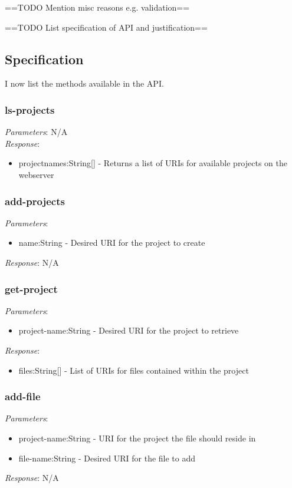 \documentclass{report}
\begin{document}
==TODO Mention misc reasons e.g. validation==


==TODO List specification of API and justification==
\subsection{Specification}
I now list the methods available in the API.
\subsubsection{ls-projects}

\emph{Parameters}: N/A
\\
\emph{Response}: 
\begin{itemize}
\item projectnames:String[] - Returns a list of URIs for available projects on the webserver
\end{itemize} 

\subsubsection{add-projects}

\emph{Parameters}: 
\begin{itemize}
\item name:String - Desired URI for the project to create
\end{itemize}
\emph{Response}: N/A

\subsubsection{get-project}
\emph{Parameters}: 
\begin{itemize}
\item project-name:String - Desired URI for the project to retrieve
\end{itemize}
\emph{Response}: 
\begin{itemize}
\item files:String[] - List of URIs for files contained within the project 
\end{itemize}

\subsubsection{add-file}
\emph{Parameters}: 
\begin{itemize}
\item project-name:String - URI for the project the file should reside in
\item file-name:String - Desired URI for the file to add
\end{itemize}
\emph{Response}: N/A
\end{document}
